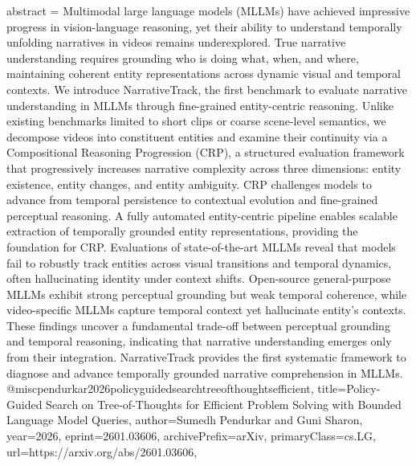 {      abstract = {Multimodal large language models (MLLMs) have achieved impressive progress in vision-language reasoning, yet their ability to understand temporally unfolding narratives in videos remains underexplored. True narrative understanding requires grounding who is doing what, when, and where, maintaining coherent entity representations across dynamic visual and temporal contexts. We introduce NarrativeTrack, the first benchmark to evaluate narrative understanding in MLLMs through fine-grained entity-centric reasoning. Unlike existing benchmarks limited to short clips or coarse scene-level semantics, we decompose videos into constituent entities and examine their continuity via a Compositional Reasoning Progression (CRP), a structured evaluation framework that progressively increases narrative complexity across three dimensions: entity existence, entity changes, and entity ambiguity. CRP challenges models to advance from temporal persistence to contextual evolution and fine-grained perceptual reasoning. A fully automated entity-centric pipeline enables scalable extraction of temporally grounded entity representations, providing the foundation for CRP. Evaluations of state-of-the-art MLLMs reveal that models fail to robustly track entities across visual transitions and temporal dynamics, often hallucinating identity under context shifts. Open-source general-purpose MLLMs exhibit strong perceptual grounding but weak temporal coherence, while video-specific MLLMs capture temporal context yet hallucinate entity's contexts. These findings uncover a fundamental trade-off between perceptual grounding and temporal reasoning, indicating that narrative understanding emerges only from their integration. NarrativeTrack provides the first systematic framework to diagnose and advance temporally grounded narrative comprehension in MLLMs.}
}@misc{pendurkar2026policyguidedsearchtreeofthoughtsefficient,
      title={Policy-Guided Search on Tree-of-Thoughts for Efficient Problem Solving with Bounded Language Model Queries}, 
      author={Sumedh Pendurkar and Guni Sharon},
      year={2026},
      eprint={2601.03606},
      archivePrefix={arXiv},
      primaryClass={cs.LG},
      url={https://arxiv.org/abs/2601.03606},
}
